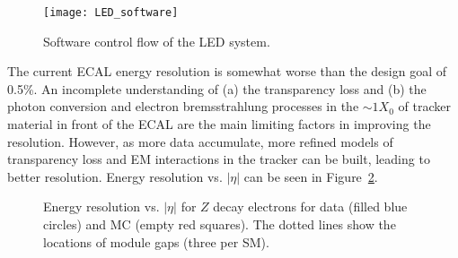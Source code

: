 \documentclass[dissertation.tex]{subfiles}
\begin{document}
\begin{figure}
	\centering
	\texttt{[image: LED\_software]}
	\caption{Software control flow of the LED system.}
	\label{fig:LED_software}
\end{figure}

The current ECAL energy resolution is somewhat worse than the design goal of 0.5\%.  An incomplete understanding of (a) the transparency loss and (b) the photon conversion and electron bremsstrahlung processes in the $\sim1X_{0}$ of tracker material in front of the ECAL are the main limiting factors in improving the resolution.  However, as more data accumulate, more refined models of transparency loss and EM interactions in the tracker can be built, leading to better resolution.  Energy resolution vs. $|\eta|$ can be seen in Figure~\ref{fig:ECAL_res_vs_eta}.

\begin{figure}
	\centering
	\hspace{1cm}
	\caption{Energy resolution vs. $|\eta|$ for $Z$ decay electrons for data (filled blue circles) and MC (empty red squares).  The dotted lines show the locations of module gaps (three per SM).}
	\label{fig:ECAL_res_vs_eta}
\end{figure}
\end{document}
